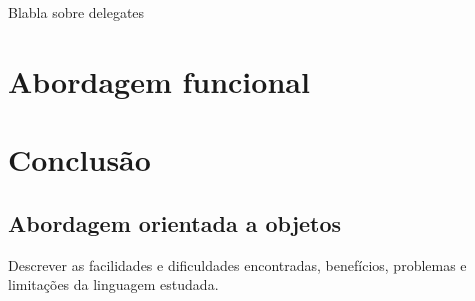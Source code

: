 \documentclass[rel_mlp]{iiufrgs}
\numberwithin{figure}{chapter}
\begin{document}
Blabla sobre delegates

%
\chapter{Abordagem funcional}


%
\chapter{Conclusão}

\section{Abordagem orientada a objetos}

Descrever as facilidades e dificuldades encontradas, benefícios, problemas e limitações da linguagem estudada.


%

%




\end{document}
